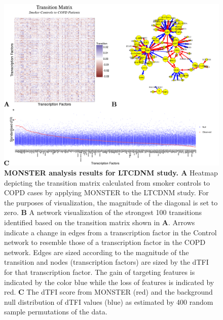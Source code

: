 \begin{figure}
\includegraphics[width=1\linewidth]{figures/figure2LTCDNM}
\caption{\textbf{MONSTER analysis results for LTCDNM study. A } Heatmap depicting the transition matrix calculated from smoker controls to COPD cases by applying MONSTER to the LTCDNM study. For the purposes of visualization, the magnitude of the diagonal is set to zero. \textbf{B} A network visualization of the strongest 100 transitions identified based on the transition matrix shown in \textbf{A}. Arrows indicate a change in edges from a transcription factor in the Control network to resemble those of a transcription factor in the COPD network. Edges are sized according to the magnitude of the transition and nodes (transcription factors) are sized by the dTFI for that transcription factor. The gain of targeting features is indicated by the color blue while the loss of features is indicated by red. \textbf{C} The dTFI score from MONSTER (red) and the background null distribution of dTFI values (blue) as estimated by 400 random sample permutations of the data.}
\label{fig:figure2LTCDNM}
\end{figure}


